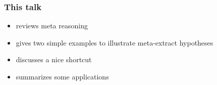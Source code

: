 \begin{frame}[fragile]
\frametitle{This talk}
  \begin{itemize}

  \item reviews meta reasoning

  \item gives two simple examples to illustrate meta-extract hypotheses

  \item discusses a nice shortcut

  \item summarizes some applications %


  \end{itemize}

\end{frame}
